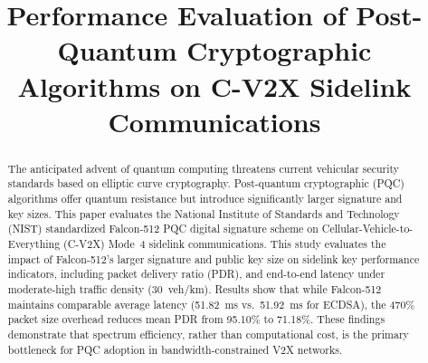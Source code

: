 \documentclass[conference]{IEEEtran}
\begin{document}
\title{Performance Evaluation of Post-Quantum Cryptographic Algorithms on C-V2X Sidelink Communications}

\author{
\and
{}
\and
{}
\and
{}
\and
{}
\and
{}
}

\maketitle

\begin{abstract}
The anticipated advent of quantum computing threatens current vehicular security standards based on elliptic curve cryptography. Post-quantum cryptographic (PQC) algorithms offer quantum resistance but introduce significantly larger signature and key sizes. This paper evaluates the National Institute of Standards and Technology (NIST) standardized Falcon-512 PQC digital signature scheme on Cellular-Vehicle-to-Everything (C-V2X) Mode~4 sidelink communications. This study evaluates the impact of Falcon-512's larger signature and public key size on sidelink key performance indicators, including packet delivery ratio (PDR), and end-to-end latency under moderate-high traffic density (30~veh/km). Results show that while Falcon-512 maintains comparable average latency (51.82~ms vs.\ 51.92~ms for ECDSA), the 470\% packet size overhead reduces mean PDR from 95.10\% to 71.18\%. These findings demonstrate that spectrum efficiency, rather than computational cost, is the primary bottleneck for PQC adoption in bandwidth-constrained V2X networks.
\end{abstract}
\end{document}
